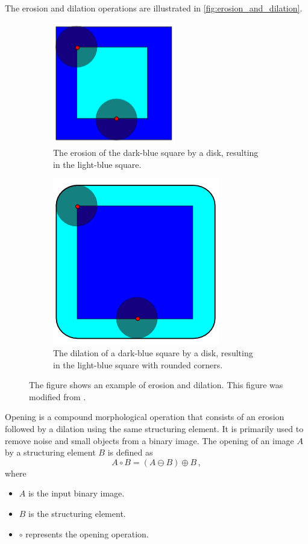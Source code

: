 The erosion and dilation operations are illustrated in \autoref{fig:erosion_and_dilation}.
\begin{figure}[!htb]
  \centering
  \begin{subfigure}[t]{0.45\textwidth}
    \centering
    \includegraphics[width=0.5\linewidth]{figures/detection/erosion.png}
    \caption{The erosion of the dark-blue square by a disk, resulting in the light-blue square.}
    \label{fig:erosion}
  \end{subfigure}
  \quad
  \begin{subfigure}[t]{0.45\textwidth}
    \centering
    \includegraphics[width=0.5\linewidth]{figures/detection/dilation.png}
    \caption{The dilation of a dark-blue square by a disk, resulting in the light-blue square with rounded corners.}
    \label{fig:dilation}
  \end{subfigure}
  \caption{The figure shows an example of erosion and dilation. This figure was modified from \cite{Renatokeshet_2023}.}
  \label{fig:erosion_and_dilation}
\end{figure}

Opening is a compound morphological operation that consists of an erosion followed by a dilation using the same structuring element. It is primarily used to remove noise and small objects from a binary image. The opening of an image $A$ by a structuring element $B$ is defined as
\begin{equation}
  A \circ B = (A \ominus B) \oplus B\,,
  \label{eq:opening}
\end{equation}
where
\begin{itemize}
  \item $A$ is the input binary image.
  \item $B$ is the structuring element.
  \item $\circ$ represents the opening operation.
\end{itemize}

